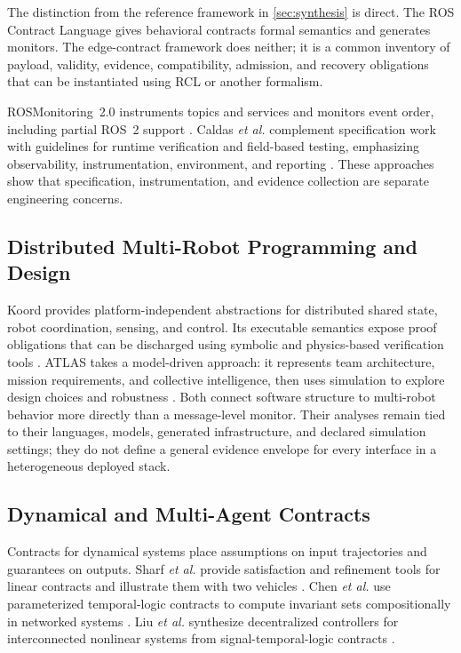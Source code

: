 The distinction from the reference framework in \cref{sec:synthesis} is direct.
The ROS Contract Language gives behavioral contracts formal semantics and
generates monitors.  The edge-contract framework does neither; it is a common
inventory of payload, validity, evidence, compatibility, admission, and recovery
obligations that can be instantiated using RCL or another formalism.

ROSMonitoring~2.0 instruments topics and services and monitors event order,
including partial ROS~2 support \cite{ghaffari2024rosmonitoring}.  Caldas
\emph{et al.} complement specification work with guidelines for runtime
verification and field-based testing, emphasizing observability,
instrumentation, environment, and reporting \cite{caldas2024rvft}.  These
approaches show that specification, instrumentation, and evidence collection
are separate engineering concerns.

\subsection{Distributed Multi-Robot Programming and Design}

Koord provides platform-independent abstractions for distributed shared state,
robot coordination, sensing, and control.  Its executable semantics expose
proof obligations that can be discharged using symbolic and physics-based
verification tools \cite{ghosh2020koord}.  ATLAS takes a model-driven approach:
it represents team architecture, mission requirements, and collective
intelligence, then uses simulation to explore design choices and robustness
\cite{harbin2023design}.  Both connect software structure to multi-robot
behavior more directly than a message-level monitor.  Their analyses remain
tied to their languages, models, generated infrastructure, and declared
simulation settings; they do not define a general evidence envelope for every
interface in a heterogeneous deployed stack.

\subsection{Dynamical and Multi-Agent Contracts}

Contracts for dynamical systems place assumptions on input trajectories and
guarantees on outputs.  Sharf \emph{et al.} provide satisfaction and refinement
tools for linear contracts and illustrate them with two vehicles
\cite{sharf2021dynamical}.  Chen \emph{et al.} use parameterized temporal-logic
contracts to compute invariant sets compositionally in networked systems
\cite{chen2019invariance}.  Liu \emph{et al.} synthesize decentralized
controllers for interconnected nonlinear systems from signal-temporal-logic
contracts \cite{liu2022stlcontracts}.

